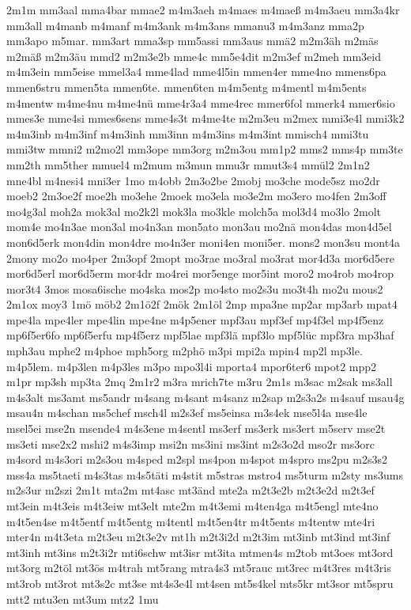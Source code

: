 {2m1m
mm3aal
mma4bar
mmae2
m4m3aeh
m4maes
m4maeß
m4m3aeu
mm3a4kr
mm3all
m4manb
m4manf
m4m3ank
m4m3ans
mmanu3
m4m3anz
mma2p
mm3apo
m5mar.
mm3art
mma3sp
mm5assi
mm3aus
mmä2
m2m3äh
m2mäs
m2mäß
m2m3äu
mmd2
m2m3e2b
mme4c
mm5e4dit
m2m3ef
m2meh
mm3eid
m4m3ein
mm5eise
mmel3a4
mme4lad
mme4l5in
mmen4er
mme4no
mmens6pa
mmen6stru
mmen5ta
mmen6te.
mmen6ten
m4m5entg
m4mentl
m4m5ents
m4mentw
m4me4nu
m4me4nü
mme4r3a4
mme4rec
mmer6fol
mmerk4
mmer6sio
mmes3e
mme4si
mmes6sens
mme4s3t
m4me4te
m2m3eu
m2mex
mmi3e4l
mmi3k2
m4m3inb
m4m3inf
m4m3inh
mm3inn
m4m3ins
m4m3int
mmisch4
mmi3tu
mmi3tw
mmni2
m2mo2l
mm3ope
mm3org
m2m3ou
mm1p2
mms2
mms4p
mm3te
mm2th
mm5ther
mmuel4
m2mum
m3mun
mmu3r
mmut3s4
mmül2
2m1n2
mne4bl
m4nesi4
mni3er
1mo
m4obb
2m3o2be
2mobj
mo3che
mode5sz
mo2dr
moeb2
2m3oe2f
moe2h
mo3ehe
2moek
mo3ela
mo3e2m
mo3ero
mo4fen
2m3off
mo4g3al
moh2a
mok3al
mo2k2l
mok3la
mo3kle
molch5a
mol3d4
mo3lo
2molt
mom4e
mo4n3ae
mon3al
mo4n3an
mon5ato
mon3au
mo2nä
mon4das
mon4d5el
mon6d5erk
mon4din
mon4dre
mo4n3er
moni4en
moni5er.
mons2
mon3su
mont4a
2mony
mo2o
mo4per
2m3opf
2mopt
mo3rae
mo3ral
mo3rat
mor4d3a
mor6d5ere
mor6d5erl
mor6d5erm
mor4dr
mo4rei
mor5enge
mor5int
moro2
mo4rob
mo4rop
mor3t4
3mos
mosa6ische
mo4ska
mos2p
mo4sto
mo2s3u
mo3t4h
mo2u
mous2
2m1ox
moy3
1mö
möb2
2m1ö2f
2mök
2m1öl
2mp
mpa3ne
mp2ar
mp3arb
mpat4
mpe4la
mpe4ler
mpe4lin
mpe4ne
m4p5ener
mpf3au
mpf3ef
mp4f3el
mp4f5enz
mp6f5er6fo
mp6f5erfu
mp4f5erz
mpf5lae
mpf3lä
mpf3lo
mpf5lüc
mpf3ra
mp3haf
mph3au
mphe2
m4phoe
mph5org
m2phö
m3pi
mpi2a
mpin4
mp2l
mp3le.
m4p5lem.
m4p3len
m4p3les
m3po
mpo3l4i
mporta4
mpor6ter6
mpot2
mpp2
m1pr
mp3sh
mp3ta
2mq
2m1r2
m3ra
mrich7te
m3ru
2m1s
m3sac
m2sak
ms3all
m4s3alt
ms3amt
ms5andr
m4sang
m4sant
m4sanz
m2sap
m2s3a2s
m4sauf
msau4g
msau4n
m4schan
ms5chef
msch4l
m2s3ef
ms5einsa
m3s4ek
mse5l4a
mse4le
msel5ei
mse2n
msende4
m4s3ene
m4sentl
ms3erf
ms3erk
ms3ert
m5serv
mse2t
ms3eti
mse2x2
mshi2
m4s3imp
msi2n
ms3ini
ms3int
m2s3o2d
mso2r
ms3orc
m4sord
m4s3ori
m2s3ou
m4sped
m2spl
ms4pon
m4spot
m4spro
ms2pu
m2s3s2
mss4a
ms5taeti
m4s3tas
m4s5täti
m4stit
m5stras
mstro4
ms5turm
m2sty
ms3ums
m2s3ur
m2szi
2m1t
mta2m
mt4asc
mt3änd
mte2a
m2t3e2b
m2t3e2d
m2t3ef
mt3ein
m4t3eis
m4t3eiw
mt3elt
mte2m
m4t3emi
m4ten4ga
m4t5engl
mte4no
m4t5en4se
m4t5entf
m4t5entg
m4tentl
m4t5en4tr
m4t5ents
m4tentw
mte4ri
mter4n
m4t3eta
m2t3eu
m2t3e2v
mt1h
m2t3i2d
m2t3im
mt3inb
mt3ind
mt3inf
mt3inh
mt3ins
m2t3i2r
mti6schw
mt3isr
mt3ita
mtmen4s
m2tob
mt3oes
mt3ord
mt3org
m2töl
mt3ös
m4trah
mt5rang
mtra4s3
mt5rauc
mt3rec
m4t3res
m4t3ris
mt3rob
mt3rot
mt3s2c
mt3se
mt4s3e4l
mt4sen
mt5s4kel
mts5kr
mt3sor
mt5spru
mtt2
mtu3en
mt3um
mtz2
1mu
}
